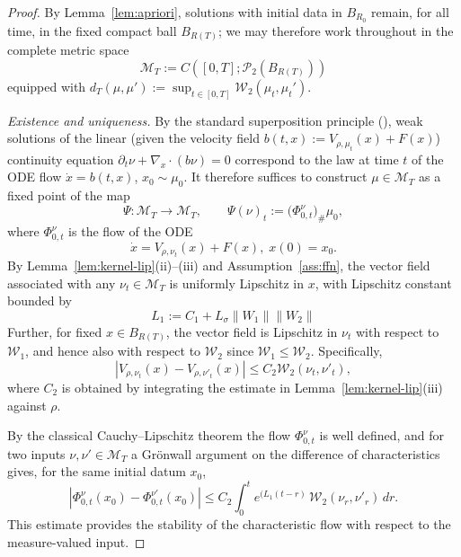 \documentclass[11pt,a4wide]{article}
\theoremstyle{definition}
\newcommand{\Prob}{\mathcal{P}}
\newcommand{\Wass}{\mathcal{W}}
\begin{document}
\begin{proof}
By Lemma~\ref{lem:apriori}, solutions with initial data in $B_{R_0}$ remain, for all time, in the fixed compact ball $B_{R(T)}$; we may therefore work throughout in the complete metric space 
$$
\mathcal M_T := C([0,T];\Prob_2(B_{R(T)}))
$$
 equipped with $d_T(\mu,\mu') := \sup_{t\in[0,T]}\Wass_2(\mu_t,\mu_t')$.

\emph{Existence and uniqueness.} By the standard superposition principle (\cite[Theorem~8.2.1]{ambrosio2008gradient}), weak solutions of the linear (given the velocity field $b(t,x):=V_{\rho,\mu_t}(x)+F(x)$) continuity equation $\partial_t\nu+\nabla_x \cdot(b\nu)=0$ correspond  to the law at time $t$ of the ODE flow $\dot x=b(t,x)$, $x_0 \sim\mu_0$. It therefore suffices to construct $\mu\in\mathcal M_T$ as a fixed point of the map
\[
\Psi:\mathcal M_T\to\mathcal M_T, \qquad \Psi(\nu)_t := \big(\Phi^{\nu}_{0,t}\big)_\#\mu_0,
\]
where $\Phi^{\nu}_{0,t}$ is the flow of the  ODE 
$$\dot x = V_{\rho,\nu_t}(x)+F(x), \; x(0)=x_0.$$  By Lemma~\ref{lem:kernel-lip}(ii)--(iii) and Assumption~\ref{ass:ffn},  the vector field associated with any $\nu_t\in \mathcal M_T$ is uniformly Lipschitz in $x$,  with Lipschitz constant bounded by 
$$
L_1:=  C_1+L_\sigma\|W_1\|\|W_2\|
$$
Further, for  fixed $x\in B_{R(T)}$, the vector field is Lipschitz in $\nu_t$ with respect to  $\Wass_1$, and hence also with respect to  $\Wass_2$ since   $\Wass_1\le \Wass_2$. Specifically, 
$$
|V_{\rho, \nu_t}(x) -V_{\rho, \nu'_t}(x)|\leq C_2 \Wass_2(\nu_t, \nu'_t),
$$
where $C_2$  is obtained by integrating the estimate in Lemma~\ref{lem:kernel-lip}(iii) against $\rho$. 

By the classical Cauchy--Lipschitz theorem the flow $\Phi^\nu_{0,t}$ is well defined, and for  two inputs $\nu,\nu'\in\mathcal M_T$ a Gr\"onwall argument on the difference of characteristics gives, for the same initial datum $x_0$,
\begin{equation}
|\Phi^\nu_{0,t}(x_0)-\Phi^{\nu'}_{0,t}(x_0)| \le C_2 \int_0^t e^{(L_1(t-r)}\,\Wass_2(\nu_r,\nu'_r)\,dr.
\end{equation}
This estimate provides the stability of the characteristic flow with respect to the measure-valued input. 


\end{proof}
\end{document}
